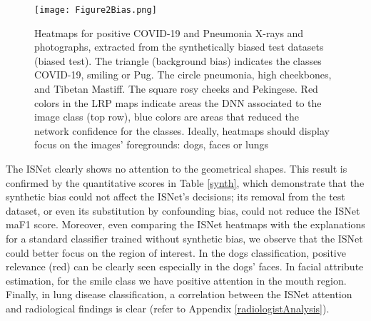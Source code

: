 \documentclass[fleqn,10pt]{wlscirep}
\begin{document}
{\begin{figure}[!h]
\texttt{[image: Figure2Bias.png]}
\centering
\caption{Heatmaps for positive COVID-19 and Pneumonia X-rays and photographs, extracted from the synthetically biased test datasets (biased test). The triangle (background bias) indicates the classes COVID-19, smiling or Pug. The circle pneumonia, high cheekbones, and Tibetan Mastiff. The square rosy cheeks and Pekingese. Red colors in the LRP maps indicate areas the DNN associated to the image class (top row), blue colors are areas that reduced the network confidence for the classes. Ideally, heatmaps should display focus on the images' foregrounds: dogs, faces or lungs}
\label{triangle}
\end{figure}

The ISNet clearly shows no attention to the geometrical shapes. This result is confirmed by the quantitative scores in Table \ref{synth}, which demonstrate that the synthetic bias could not affect the ISNet's decisions; its removal from the test dataset, or even its substitution by confounding bias, could not reduce the ISNet maF1 score. Moreover, even comparing the ISNet heatmaps with the explanations for a standard classifier trained without synthetic bias, we observe that the ISNet could better focus on the region of interest. In the dogs classification, positive relevance (red) can be clearly seen especially in the dogs' faces. In facial attribute estimation, for the smile class we have positive attention in the mouth region. Finally, in lung disease classification, a correlation between the ISNet attention and radiological findings is clear (refer to Appendix \ref{radiologistAnalysis}).

}
\end{document}
